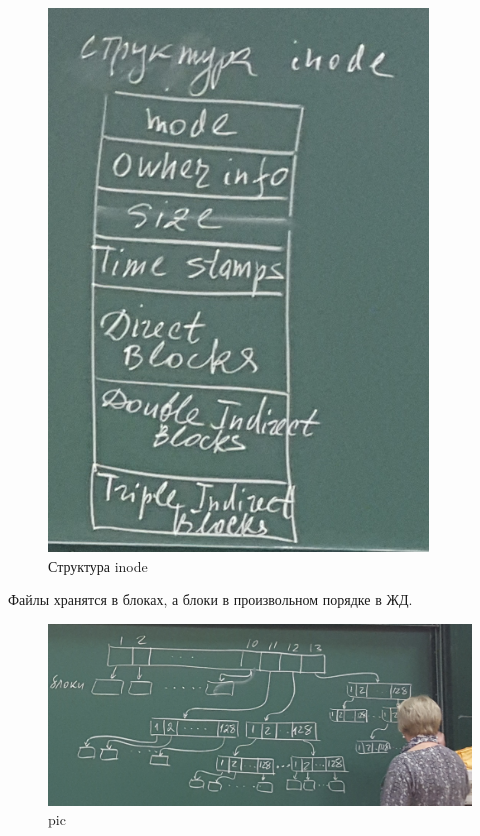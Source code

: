 \begin{figure}[H]
  \centering
  \includegraphics[width=\textwidth]{pic/7.png}
  \caption{Структура inode}
\end{figure}

Файлы хранятся в блоках, а блоки в произвольном порядке в ЖД.

\begin{figure}[H]
  \centering
  \includegraphics[width=\textwidth]{pic/5.png}
  \caption{pic}
\end{figure}

